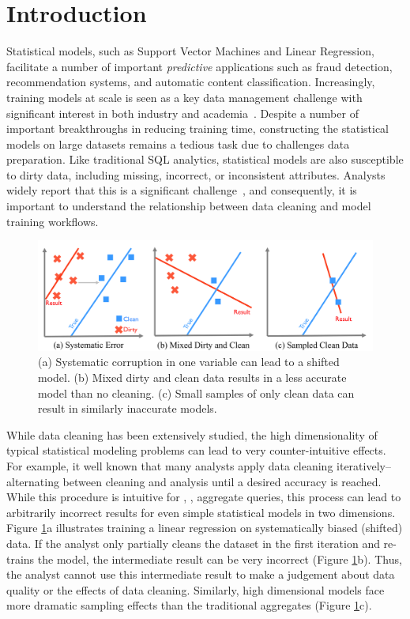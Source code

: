 \section{Introduction}
Statistical models, such as Support Vector Machines and Linear Regression, facilitate a number of important \emph{predictive} applications such as fraud detection, recommendation systems, and automatic content classification.
Increasingly, training models at scale is seen as a key data management challenge with significant interest in both industry and academia~\cite{bdas, alexandrov2014stratosphere, crotty2014tupleware, tensor}.    
Despite a number of important breakthroughs in reducing training time, constructing the statistical models on large datasets remains a tedious task due to challenges data preparation. 
Like traditional SQL analytics, statistical models are also susceptible to dirty data, including missing, incorrect, or inconsistent attributes.
Analysts widely report that this is a significant challenge~\cite{kandel2012,nytimes}, and consequently, it is important to understand the relationship between data cleaning and model training workflows.

\begin{figure}[t]
\centering
 \includegraphics[width=\columnwidth]{figs/update-arch.png}
 \caption{(a) Systematic corruption in one variable can lead to a shifted model. 
 (b) Mixed dirty and clean data results in a less accurate model than no cleaning.
(c) Small samples of only clean data can result in similarly inaccurate models. \label{update-arch1}}
\end{figure}

While data cleaning has been extensively studied, the high dimensionality of typical statistical modeling problems can lead to very counter-intuitive effects.
For example, it well known that many analysts apply data cleaning iteratively--alternating between cleaning and analysis until a desired accuracy is reached.
While this procedure is intuitive for \sumfunc, \countfunc, \avgfunc aggregate queries, this process can lead to arbitrarily incorrect results for even simple statistical models in two dimensions.
Figure \ref{update-arch1}a illustrates training a linear regression on systematically biased (shifted) data.
If the analyst only partially cleans the dataset in the first iteration and re-trains the model, the intermediate result can be very incorrect (Figure \ref{update-arch1}b).
Thus, the analyst cannot use this intermediate result to make a judgement about data quality or the effects of data cleaning. 
Similarly, high dimensional models face more dramatic sampling effects than the traditional aggregates (Figure \ref{update-arch1}c).

